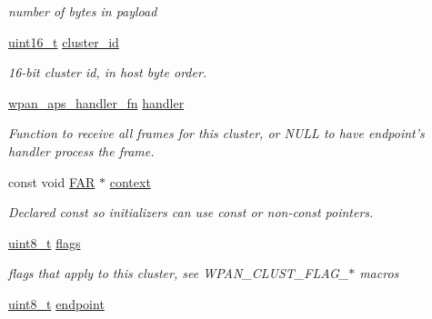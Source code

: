 \begin{DoxyCompactItemize}
\begin{DoxyCompactList}\small\item\em number of bytes in payload \end{DoxyCompactList}\item 
\hyperlink{group__hal_ga5a8b2dc9e45a9ee81a94ef304fb62505}{uint16\-\_\-t} \hyperlink{group__wpan__aps_ga262a92f94287e77cb56350951893bae2}{cluster\-\_\-id}
\begin{DoxyCompactList}\small\item\em 16-\/bit cluster id, in host byte order. \end{DoxyCompactList}\item 
\hyperlink{group__wpan__aps_ga62b1036c0e296905f2d9a74e7e480297}{wpan\-\_\-aps\-\_\-handler\-\_\-fn} \hyperlink{group__wpan__aps_gab0c5e32241c4c2860c728aeab4b6f253}{handler}
\begin{DoxyCompactList}\small\item\em Function to receive all frames for this cluster, or N\-U\-L\-L to have endpoint's handler process the frame. \end{DoxyCompactList}\item 
const void \hyperlink{group__hal_gaef060b3456fdcc093a7210a762d5f2ed}{F\-A\-R} $\ast$ \hyperlink{group__wpan__aps_gad58378484a15ab673f5eb1613114330e}{context}
\begin{DoxyCompactList}\small\item\em Declared {\ttfamily const} so initializers can use {\ttfamily const} or non-\/{\ttfamily const} pointers. \end{DoxyCompactList}\item 
\hypertarget{group__wpan__aps_gaa2585d779da0ab21273a8d92de9a0ebe}{\hyperlink{group__hal_gae1affc9ca37cfb624959c866a73f83c2}{uint8\-\_\-t} \hyperlink{group__wpan__aps_gaa2585d779da0ab21273a8d92de9a0ebe}{flags}}\label{group__wpan__aps_gaa2585d779da0ab21273a8d92de9a0ebe}

\begin{DoxyCompactList}\small\item\em flags that apply to this cluster, see W\-P\-A\-N\-\_\-\-C\-L\-U\-S\-T\-\_\-\-F\-L\-A\-G\-\_\-$\ast$ macros \end{DoxyCompactList}\item 
\hypertarget{group__wpan__aps_ga7d397493728da2bca8d55b2d61c4ec5d}{\hyperlink{group__hal_gae1affc9ca37cfb624959c866a73f83c2}{uint8\-\_\-t} \hyperlink{group__wpan__aps_ga7d397493728da2bca8d55b2d61c4ec5d}{endpoint}}\label{group__wpan__aps_ga7d397493728da2bca8d55b2d61c4ec5d}


\end{DoxyCompactItemize}
